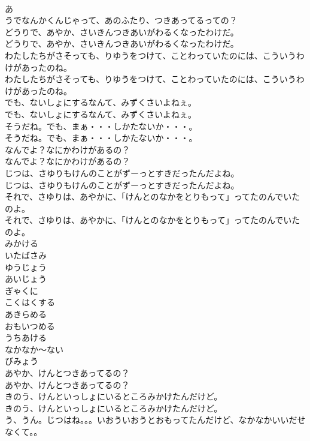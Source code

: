 \documentclass[8pt]{extreport}
\begin{document}
\begin{CJK}{UTF8}{min}
\\	あ
\\	うでなんかくんじゃって、あのふたり、つきあってるっての？
\\	どうりで、あやか、さいきんつきあいがわるくなったわけだ。
\\	どうりで、あやか、さいきんつきあいがわるくなったわけだ。
\\	わたしたちがさそっても、りゆうをつけて、ことわっていたのには、こういうわけがあったのね。
\\	わたしたちがさそっても、りゆうをつけて、ことわっていたのには、こういうわけがあったのね。
\\	でも、ないしょにするなんて、みずくさいよねぇ。
\\	でも、ないしょにするなんて、みずくさいよねぇ。
\\	そうだね。でも、まぁ・・・しかたないか・・・。
\\	そうだね。でも、まぁ・・・しかたないか・・・。
\\	なんでよ？なにかわけがあるの？
\\	なんでよ？なにかわけがあるの？
\\	じつは、さゆりもけんのことがずーっとすきだったんだよね。
\\	じつは、さゆりもけんのことがずーっとすきだったんだよね。
\\	それで、さゆりは、あやかに、「けんとのなかをとりもって」ってたのんでいたのよ。
\\	それで、さゆりは、あやかに、「けんとのなかをとりもって」ってたのんでいたのよ。
\\	みかける
\\	いたばさみ
\\	ゆうじょう
\\	あいじょう
\\	ぎゃくに
\\	こくはくする
\\	あきらめる
\\	おもいつめる
\\	うちあける
\\	なかなか～ない
\\	びみょう
\\	あやか、けんとつきあってるの？
\\	あやか、けんとつきあってるの？
\\	きのう、けんといっしょにいるところみかけたんだけど。
\\	きのう、けんといっしょにいるところみかけたんだけど。
\\	う、うん。じつはね。。。いおういおうとおもってたんだけど、なかなかいいだせなくて。。

\end{CJK}
\end{document}
